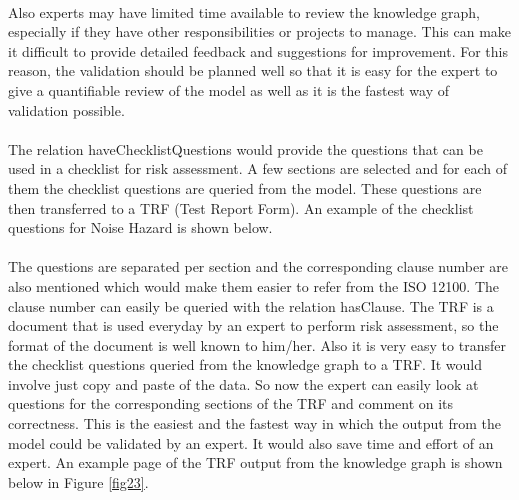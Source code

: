 \paragraph{} Also experts may have limited time available to review the knowledge graph, especially if they have other responsibilities or projects to manage. This can make it difficult to provide detailed feedback and suggestions for improvement. For this reason, the validation should be planned well so that it is easy for the expert to give a quantifiable review of the model as well as it is the fastest way of validation possible.

\paragraph{} The relation haveChecklistQuestions would provide the questions that can be used in a checklist for risk assessment. A few sections are selected and for each of them the checklist questions are queried from the model. These questions are then transferred to a TRF (Test Report Form). An example of the checklist questions for Noise Hazard is shown below. 


 \bigskip\bigskip {}

\paragraph{} The questions are separated per section and the corresponding clause number are also mentioned which would make them easier to refer from the ISO 12100. The clause number can easily be queried with the relation hasClause. The TRF is a document that is used everyday by an expert to perform risk assessment, so the format of the document is well known to him/her. Also it is very easy to transfer the checklist questions queried from the knowledge graph to a TRF. It would involve just copy and paste of the data. So now the expert can easily look at questions for the corresponding sections of the TRF and comment on its correctness. This is the easiest and the fastest way in which the output from the model could be validated by an expert. It would also save time and effort of an expert. An example page of the TRF output from the knowledge graph is shown below in Figure \ref{fig23}.

